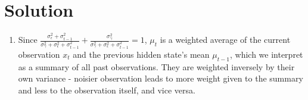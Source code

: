 \documentclass[submit]{../harvardml}
\newenvironment{solution}
  {\color{blue}\section*{Solution}}
{}
\begin{document}
\begin{solution}
\begin{enumerate}
\begin{enumerate}
                    $$\sigma_t^2 = \left(\frac{1}{\sigma_{\gamma}^2} + \frac{1}{\sigma_\epsilon^2 + \sigma_{t-1}^2}\right)^{-1}$$   
            \end{enumerate}
        \item
            Since $\frac{\sigma_\epsilon^2 + \sigma_{t-1}^2}{\sigma_{\gamma}^2+\sigma_\epsilon^2 + \sigma_{t-1}^2} + \frac{\sigma_{\gamma}^2}{\sigma_{\gamma}^2+\sigma_\epsilon^2 + \sigma_{t-1}^2} = 1$, $\mu_t$ is a weighted average of the current observation $x_t$ and the previous hidden state's mean $\mu_{t-1}$, which we interpret as a summary of all past observations. They are weighted inversely by their own variance - noisier observation leads to  more weight given to the summary and less to the observation itself, and vice versa. 
	\end{enumerate}
\end{solution}

\newpage
\end{document}
